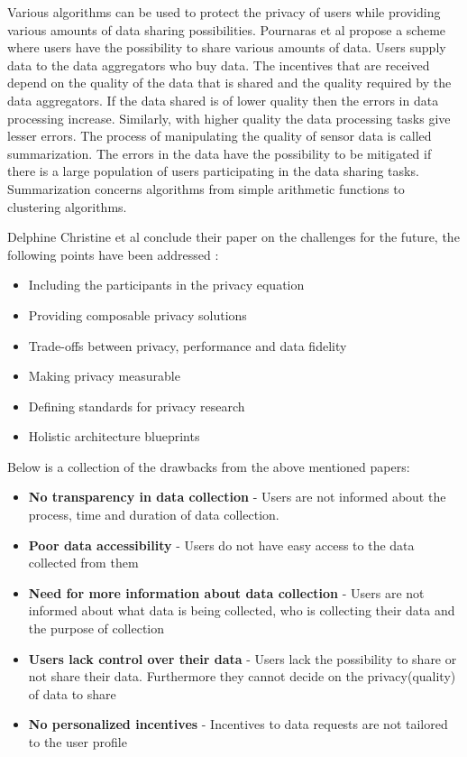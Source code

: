Various algorithms can be used to protect the privacy of users while providing various amounts of data sharing possibilities. Pournaras et al \cite{pournaras2016self} propose a scheme where users have the possibility to share various amounts of data. Users supply data to the data aggregators who buy data. The incentives that are received depend on the quality of the data that is shared and the quality required by the data aggregators. If the data shared is of lower quality then the errors in data processing increase. Similarly, with higher quality the data processing tasks give lesser errors. The process of manipulating the quality of sensor data is called summarization. The errors in the data have the possibility to be mitigated if there is a large population of users participating in the data sharing tasks. Summarization concerns algorithms from simple arithmetic functions to clustering algorithms.

Delphine Christine et al \cite{christin2016privacy} conclude their paper on the challenges for the future, the following points have been addressed \cite{pournarasethical}:

\begin{itemize}
\item Including the participants in the privacy equation
\item Providing composable privacy solutions
\item Trade-offs between privacy, performance and data fidelity
\item Making privacy measurable
\item Defining standards for privacy research
\item Holistic architecture blueprints
\end{itemize}

Below is a collection of the drawbacks from the above mentioned papers:
\begin{itemize}
\item \textbf{No transparency in data collection} - Users are not informed about the process, time and duration of data collection.
\item \textbf{Poor data accessibility} -  Users do not have easy access to the data collected from them
\item \textbf{Need for more information about data collection} - Users are not informed about what data is being collected, who is collecting their data and the purpose of collection
\item \textbf{Users lack control over their data} - Users lack the possibility to share or not share their data. Furthermore they cannot decide on the privacy(quality) of data to share
\item \textbf{No personalized incentives} - Incentives to data requests are not tailored to the user profile
\end{itemize}

